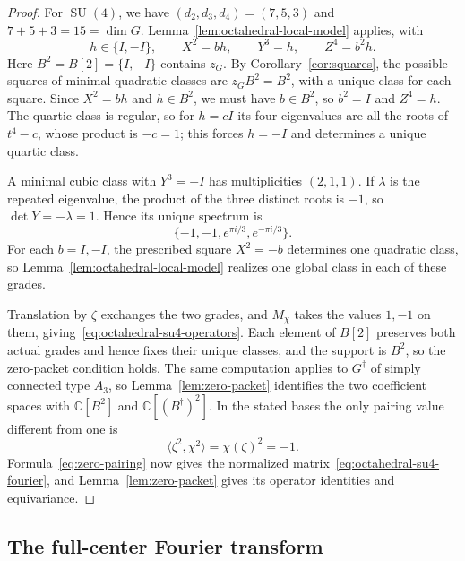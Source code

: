\documentclass[11pt,a4paper,reqno]{amsart}
\theoremstyle{plain}
\theoremstyle{definition}
\theoremstyle{remark}
\numberwithin{equation}{section}
\newcommand{\SU}{\operatorname{SU}}
\newcommand{\CC}{\mathbb C}
\newcommand{\pair}[2]{\langle #1,#2\rangle}
\begin{document}
\begin{proof}
For $\SU(4)$, we have $(d_2,d_3,d_4)=(7,5,3)$ and $7+5+3=15=\dim G$. Lemma~\ref{lem:octahedral-local-model} applies, with
\[
h\in\{I,-I\},\qquad X^2=bh,\qquad Y^3=h,\qquad Z^4=b^2h.
\]
Here $B^2=B[2]=\{I,-I\}$ contains $z_G$. By Corollary~\ref{cor:squares}, the possible squares of minimal quadratic classes are $z_G B^2=B^2$, with a unique class for each square. Since $X^2=bh$ and $h\in B^2$, we must have $b\in B^2$, so $b^2=I$ and $Z^4=h$. The quartic class is regular, so for $h=cI$ its four eigenvalues are all the roots of $t^4-c$, whose product is $-c=1$; this forces $h=-I$ and determines a unique quartic class.

A minimal cubic class with $Y^3=-I$ has multiplicities $(2,1,1)$. If $\lambda$ is the repeated eigenvalue, the product of the three distinct roots is $-1$, so $\det Y=-\lambda=1$. Hence its unique spectrum is
\[
\{-1,-1,e^{\pi i/3},e^{-\pi i/3}\}.
\]
For each $b=I,-I$, the prescribed square $X^2=-b$ determines one quadratic class, so Lemma~\ref{lem:octahedral-local-model} realizes one global class in each of these grades.

Translation by $\zeta$ exchanges the two grades, and $M_\chi$ takes the values $1,-1$ on them, giving~\eqref{eq:octahedral-su4-operators}. Each element of $B[2]$ preserves both actual grades and hence fixes their unique classes, and the support is $B^2$, so the zero-packet condition holds. The same computation applies to $G^\dagger$ of simply connected type $A_3$, so Lemma~\ref{lem:zero-packet} identifies the two coefficient spaces with $\CC[B^2]$ and $\CC[(B^\dagger)^2]$. In the stated bases the only pairing value different from one is
\[
\pair{\zeta^2}{\chi^2}=\chi(\zeta)^2=-1.
\]
Formula~\eqref{eq:zero-pairing} now gives the normalized matrix~\eqref{eq:octahedral-su4-fourier}, and Lemma~\ref{lem:zero-packet} gives its operator identities and equivariance.
\end{proof}

\subsection{The full-center Fourier transform}
\end{document}
